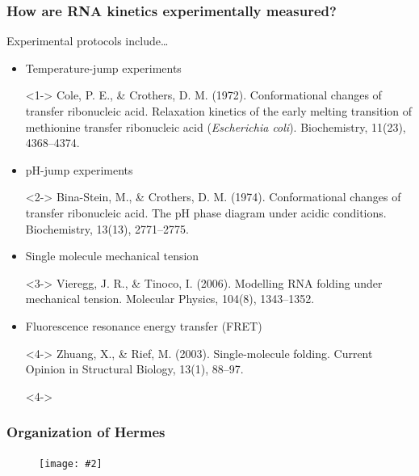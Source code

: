\documentclass{beamer}
\newcommand{\slidefigure}[2][1]{\texttt{[image: \#2]}}
\begin{document}
\begin{frame}
  \frametitle{How are RNA kinetics experimentally measured?}

  \begin{block}
    {Experimental protocols include\dots}
    \begin{itemize}
      \item<1-> Temperature-jump experiments
      \item[]<1-> \scriptsize Cole, P. E., \& Crothers, D. M. (1972). Conformational changes of transfer ribonucleic acid. Relaxation kinetics of the early melting transition of methionine transfer ribonucleic acid ({\em Escherichia coli}). Biochemistry, 11(23), 4368--4374.
      \item<2-> pH-jump experiments
      \item[]<2-> \scriptsize Bina-Stein, M., \& Crothers, D. M. (1974). Conformational changes of transfer ribonucleic acid. The pH phase diagram under acidic conditions. Biochemistry, 13(13), 2771--2775.
      \item<3-> Single molecule mechanical tension
      \item[]<3-> \scriptsize Vieregg, J. R., \& Tinoco, I. (2006). Modelling RNA folding under mechanical tension. Molecular Physics, 104(8), 1343--1352.
      \item<4-> Fluorescence resonance energy transfer (FRET)
      \item[]<4-> \scriptsize Zhuang, X., \& Rief, M. (2003). Single-molecule folding. Current Opinion in Structural Biology, 13(1), 88--97.
      \item[]<4->
    \end{itemize}
  \end{block}
\end{frame}

\begin{frame}
	\frametitle{Organization of Hermes}
	\begin{figure}
		\centering \slidefigure{Figures/Hermes/softwareOrg}
	\end{figure}
\end{frame}

\end{document}

